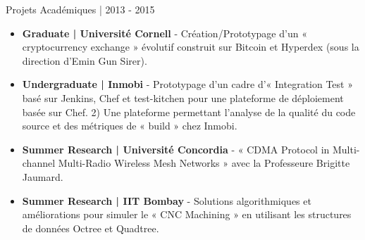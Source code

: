 \documentclass[10pt]{article} %
\begin{document}
{\raggedright\large Projets Académiques \normalsize\textsc{ | 2013 - 2015}\\}
\begin{itemize}\itemsep-0.5em
    \item \textbf{Graduate | Université Cornell} - Création/Prototypage d'un « cryptocurrency exchange » évolutif construit sur Bitcoin et Hyperdex (sous la direction d'Emin Gun Sirer).
    \item \textbf{Undergraduate | Inmobi} - Prototypage d'un cadre d'« Integration Test » basé sur Jenkins, Chef et test-kitchen pour une plateforme de déploiement basée sur Chef. 2) Une plateforme permettant l'analyse de la qualité du code source et des métriques de « build » chez Inmobi.
    \item \textbf{Summer Research | Université Concordia} - « CDMA Protocol in Multi-channel Multi-Radio Wireless Mesh Networks » avec la Professeure Brigitte Jaumard.
    \item \textbf{Summer Research | IIT Bombay} - Solutions algorithmiques et améliorations pour simuler le « CNC Machining » en utilisant les structures de données Octree et Quadtree.
\end{itemize}

\end{document}
